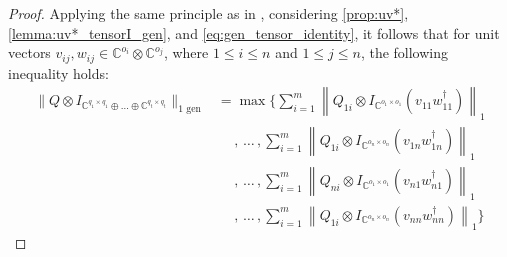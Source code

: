 \begin{proof}
  Applying the same principle as in \cite[Proof of Theorem 3.36]{watrous2018theory}, considering \autoref{prop:uv*}, \autoref{lemma:uv*_tensorI_gen}, and \autoref{eq:gen_tensor_identity},  it follows that for unit vectors $v_{ij}, w_{ij} \in \mathbb{C}^{o_i} \otimes \mathbb{C}^{o_j }$, where $1 \leq i \leq n$ and $1 \leq j \leq n$, the following inequality holds:
\begin{equation}
  \begin{split}
    \lVert Q \otimes I_{\mathbb{C}^{q_1 \times q_1} \oplus \ldots \oplus \mathbb{C}^{q_t \times q_t}} \rVert_{1 \text{ gen}}  & = \max \Bigg\{ \sum_{i=1}^{m} \left\lVert Q_{1i} \otimes I_{\mathbb{C}^{o_1 \times o_1}} (v_{11} w_{11}^\dag)\right\rVert_{1}\\
    & \hspace{15pt}, \hspace{2pt} \ldots \hspace{2pt},\sum_{i=1}^{m} \left\lVert Q_{1i} \otimes I_{\mathbb{C}^{o_n \times o_n}} (v_{1n} w_{1n}^\dag)\right\rVert_{1}  \\
    &  \hspace{15pt}, \hspace{2pt} \ldots \hspace{2pt}, \sum_{i=1}^{m} \left\lVert Q_{ni} \otimes I_{\mathbb{C}^{o_1 \times o_1}} (v_{n1} w_{n1}^\dag)\right\rVert_{1} \\
    & \hspace{15pt}, \hspace{2pt} \ldots \hspace{2pt},\sum_{i=1}^{m} \left\lVert Q_{1i} \otimes I_{\mathbb{C}^{o_n \times o_n}} (v_{nn} w_{nn}^\dag)\right\rVert_{1} \Bigg\}
  \end{split}
\end{equation}




\end{proof}
